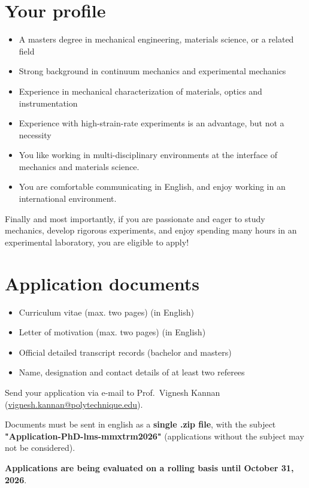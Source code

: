 \documentclass[a4paper,11pt,fleqn]{article}
\begin{document}
	\section*{Your profile}
	\begin{itemize}[leftmargin=*]
		\itemsep-0.10em
		\item A masters degree in mechanical engineering, materials science, or a related field
		\item Strong background in continuum mechanics and experimental mechanics
		\item Experience in mechanical characterization of materials, optics and instrumentation
		\item Experience with high-strain-rate experiments is an advantage, but not a necessity
		\item You like working in multi-disciplinary environments at the interface of mechanics and materials science.
		\item You are comfortable communicating in English, and enjoy working in an international environment.
	\end{itemize}
	\vspace{-1em}
	Finally and most importantly, if you are passionate and eager to study mechanics, develop rigorous experiments, and enjoy spending many hours in an experimental laboratory, you are eligible to apply!

	\section*{Application documents}
	\begin{itemize}[leftmargin=*]
		\itemsep-0.10em
		\item Curriculum vitae (max. two pages) (in English)
		\item Letter of motivation (max. two pages) (in English)
		\item Official detailed transcript records (bachelor and masters)
		\item Name, designation and contact details of at least two referees
	\end{itemize}

	\begin{center}
		\vspace*{0em}
		{Send your application} via e-mail to {Prof.~Vignesh Kannan} (\href{mailto:vignesh.kannan@polytechnique.edu}{vignesh.kannan@polytechnique.edu}).
		
		Documents must be sent {in english} as a \textbf{single .zip file}, with the subject \textbf{"Application-PhD-lms-mmxtrm2026"} (applications without the subject may not be considered). 
		
		\textbf{Applications are being evaluated on a rolling basis until October 31, 2026}. 
	\end{center}
\end{document}
